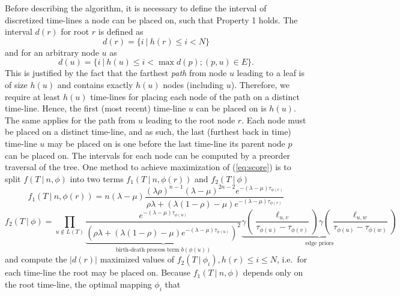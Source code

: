 \documentclass{llncs}
\begin{document}
Before describing the algorithm, it is necessary to define the interval of
discretized time-lines a node can be placed on, such that Property 1 holds. The
interval $d(r)$ for root $r$ is defined as $$d(r) = \{ i\ |\ h(r) \leq i <
N\}$$ and for an arbitrary node $u$ as $$d(u) = \{ i\ |\ h(u) \leq i < \max
d(p); (p,u) \in E\}.$$ This is justified by the fact that the farthest {\em
path} from node $u$ leading to a leaf is of size $h(u)$ and contains exactly
$h(u)$ nodes (including $u$).  Therefore, we require at least $h(u)$ time-lines
for placing each node of the path on a distinct time-line.  Hence, the first (most recent)
time-line $u$ can be placed on is $h(u)$. The same applies for the path from
$u$ leading to the root node $r$.  Each node must be placed on a distinct
time-line, and as such, the last (furthest back in time) time-line $u$ may be placed on is one before
the last time-line its parent node $p$ can be placed on. The intervals for each
node can be computed by a preorder traversal of the tree. One method to achieve
maximization of (\ref{eq:score}) is to split $f(T\ |\ n, \phi)$ into two terms
$f_1(T\ |\ n,\phi(r))$ and $f_2(T\ |\ \phi)$
%
%
\begin{equation}\label{eq:part1} 
f_1(T\ |\ n,\phi(r)) = n (\lambda-\mu)
                       \frac{(\lambda\rho)^{n-1}%
                             (\lambda-\mu)^{2n-2}%
                             e^{-(\lambda-\mu)\tau_{\phi(r)}}}%
                            {\rho\lambda +%
                             (\lambda(1 -\rho)-\mu)%
                             e^{-(\lambda-\mu)\tau_{\phi(r)}}}
\end{equation}
%
%
\begin{equation}\label{eq:part2}
f_2(T\ |\ \phi) = \prod_{u\notin L(T)}
                  \underbrace{
                    \frac{e^{-(\lambda-\mu)\tau_{\phi(u)}}}
                         {(\rho\lambda + 
                          (\lambda(1-\rho)-\mu)
                          e^{-(\lambda-\mu)\tau_{\phi(u)}})^2}
                  }_{\textrm{birth-death process term } b(\phi(u))}
                  \underbrace{
                    \gamma(\frac{\ell_{u,v}}{\tau_{\phi(u)}-\tau_{\phi(v)}})
                    \gamma(\frac{\ell_{u,w}}{\tau_{\phi(u)}-\tau_{\phi(w)}})
                  }_{\textrm{edge priors}}
\end{equation}
%
%
and compute the $|d(r)|$ maximized values of $f_2(T\ |\ \phi_i), h(r) \leq i
\leq N$, i.e.\ for each time-line the root may be placed on. Because $f_1(T\ |\
n,\phi)$ depends only on the root time-line, the optimal mapping $\phi_i$ that
\end{document}
